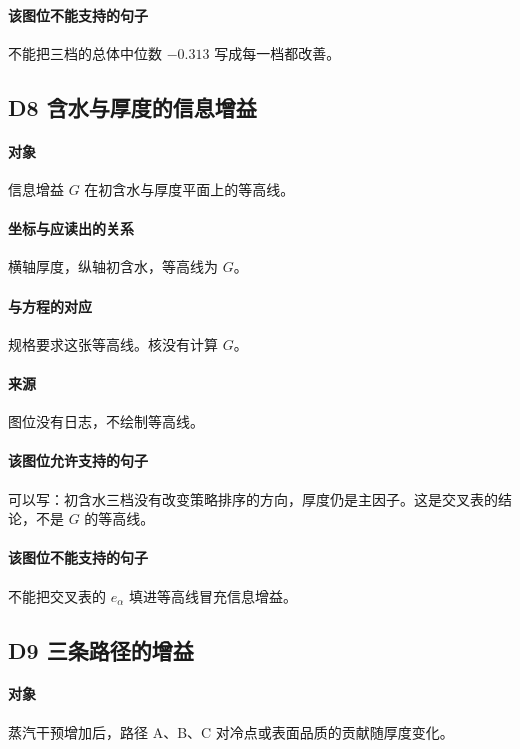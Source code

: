 \paragraph{该图位不能支持的句子}
不能把三档的总体中位数 $-0.313$ 写成每一档都改善。

\subsection{D8 含水与厚度的信息增益}
\paragraph{对象}
信息增益 $G$ 在初含水与厚度平面上的等高线。

\paragraph{坐标与应读出的关系}
横轴厚度，纵轴初含水，等高线为 $G$。

\paragraph{与方程的对应}
规格要求这张等高线。核没有计算 $G$。

\paragraph{来源}
图位没有日志，不绘制等高线。

\paragraph{该图位允许支持的句子}
可以写：初含水三档没有改变策略排序的方向，厚度仍是主因子。这是交叉表的结论，不是 $G$ 的等高线。

\paragraph{该图位不能支持的句子}
不能把交叉表的 $e_\alpha$ 填进等高线冒充信息增益。

\subsection{D9 三条路径的增益}
\paragraph{对象}
蒸汽干预增加后，路径 A、B、C 对冷点或表面品质的贡献随厚度变化。

